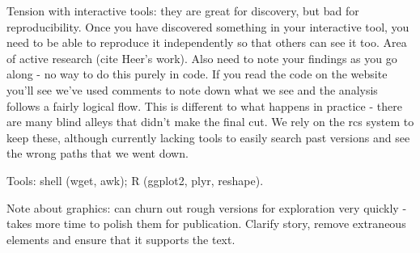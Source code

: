 \documentclass[oneside]{article}
\begin{document}
Tension with interactive tools: they are great for discovery, but bad for reproducibility.  Once you have discovered something in your interactive tool, you need to be able to reproduce it independently so that others can see it too.  Area of active research (cite Heer's work).  Also need to note your findings as you go along - no way to do this purely in code.  If you read the code on the website you'll see we've used comments to note down what we see and the analysis follows a fairly logical flow.  This is different to what happens in practice - there are many blind alleys that didn't make the final cut.  We rely on the rcs system to keep these, although currently lacking tools to easily search past versions and see the wrong paths that we went down.

Tools: shell (wget, awk); R (ggplot2, plyr, reshape).

Note about graphics: can churn out rough versions for exploration very quickly - takes more time to polish them for publication.  Clarify story, remove extraneous elements and ensure that it supports the text.



\end{document}
